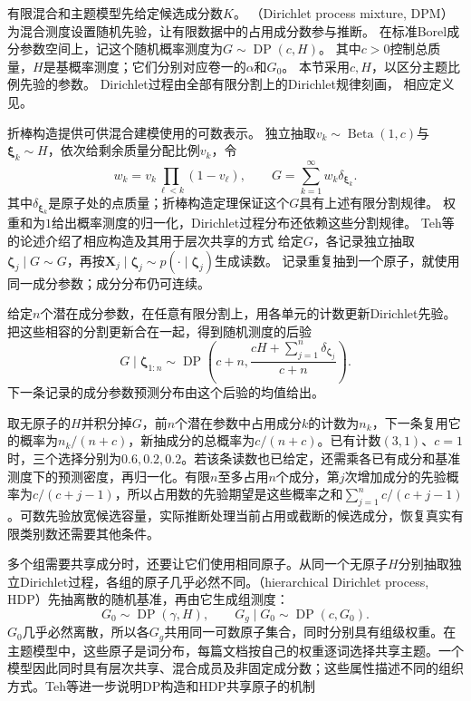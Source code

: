有限混合和主题模型先给定候选成分数$K$。
（Dirichlet process mixture, DPM）为混合测度设置随机先验，让有限数据中的占用成分数参与推断。
在标准Borel成分参数空间上，记这个随机概率测度为$G\sim\operatorname{DP}(c,H)$。
其中$c>0$控制总质量，$H$是基概率测度；它们分别对应卷一的$\alpha$和$G_0$。
本节采用$c,H$，以区分主题比例先验的参数。
Dirichlet过程由全部有限分割上的Dirichlet规律刻画，
相应定义见。

折棒构造提供可供混合建模使用的可数表示。
独立抽取$v_k\sim\operatorname{Beta}(1,c)$与$\bm\xi_k\sim H$，依次给剩余质量分配比例$v_k$，令
\[
  w_k=v_k\prod_{\ell<k}(1-v_\ell),\qquad
  G=\sum_{k=1}^{\infty}w_k\delta_{\bm{\xi}_k}.
\]
其中$\delta_{\bm\xi_k}$是原子处的点质量；折棒构造定理保证这个$G$具有上述有限分割规律。
权重和为$1$给出概率测度的归一化，Dirichlet过程分布还依赖这些分割规律。
Teh等的论述介绍了相应构造及其用于层次共享的方式
给定$G$，各记录独立抽取$\bm\zeta_j\mid G\sim G$，再按$\bm X_j\mid\bm\zeta_j\sim p(\cdot\mid\bm\zeta_j)$生成读数。
记录重复抽到一个原子，就使用同一成分参数；成分分布仍可连续。

给定$n$个潜在成分参数，在任意有限分割上，用各单元的计数更新Dirichlet先验。
把这些相容的分割更新合在一起，得到随机测度的后验
\[
  G\mid\bm\zeta_{1:n}\sim\operatorname{DP}
    \left(c+n,\frac{cH+\sum_{j=1}^n\delta_{\bm\zeta_j}}{c+n}\right).
\]
下一条记录的成分参数预测分布由这个后验的均值给出。

取无原子的$H$并积分掉$G$，前$n$个潜在参数中占用成分$k$的计数为$n_k$，下一条复用它的概率为$n_k/(n+c)$，新抽成分的总概率为$c/(n+c)$。已有计数$(3,1)$、$c=1$时，三个选择分别为$0.6,0.2,0.2$。若该条读数也已给定，还需乘各已有成分和基准测度下的预测密度，再归一化。有限$n$至多占用$n$个成分，第$j$次增加成分的先验概率为$c/(c+j-1)$，所以占用数的先验期望是这些概率之和$\sum_{j=1}^n c/(c+j-1)$。可数先验放宽候选容量，实际推断处理当前占用或截断的候选成分，恢复真实有限类别数还需要其他条件。

多个组需要共享成分时，还要让它们使用相同原子。从同一个无原子$H$分别抽取独立Dirichlet过程，各组的原子几乎必然不同。（hierarchical Dirichlet process, HDP）先抽离散的随机基准，再由它生成组测度：
\begin{equation}
  \label{eq:pgm-static-directed-hdp}
  G_0\sim\operatorname{DP}(\gamma,H),\qquad
  G_g\mid G_0\sim\operatorname{DP}(c,G_0).
\end{equation}
$G_0$几乎必然离散，所以各$G_g$共用同一可数原子集合，同时分别具有组级权重。在主题模型中，这些原子是词分布，每篇文档按自己的权重逐词选择共享主题。一个模型因此同时具有层次共享、混合成员及非固定成分数；这些属性描述不同的组织方式。Teh等进一步说明DP构造和HDP共享原子的机制

